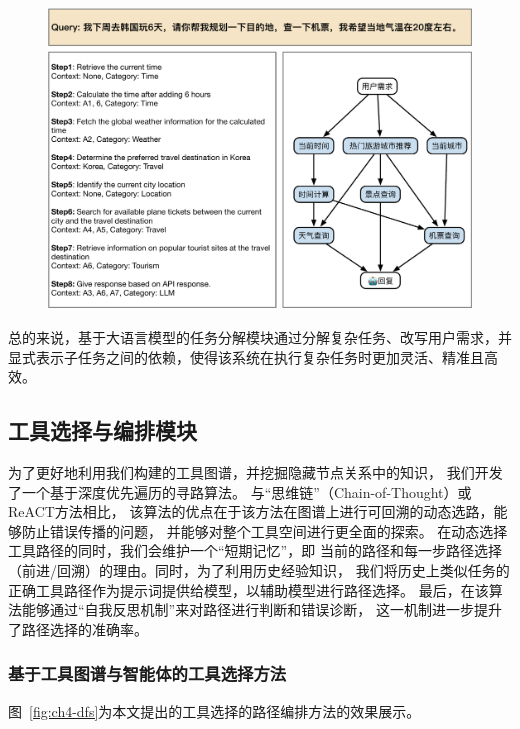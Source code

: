 \begin{figure}[!htp]
  \vspace{1em}
  \centering
  \setlength{\abovecaptionskip}{10pt} %
  \includegraphics[height=8cm]{../assets/ch4-任务分解模块.pdf}
  \label{fig:ch4-decomposition}
\end{figure}


总的来说，基于大语言模型的任务分解模块通过分解复杂任务、改写用户需求，并显式表示子任务之间的依赖，使得该系统在执行复杂任务时更加灵活、精准且高效。

\subsection{工具选择与编排模块}

为了更好地利用我们构建的工具图谱，并挖掘隐藏节点关系中的知识，
我们开发了一个基于深度优先遍历的寻路算法。
与“思维链”（Chain-of-Thought）或ReACT方法相比，
该算法的优点在于该方法在图谱上进行可回溯的动态选路，能够防止错误传播的问题，
并能够对整个工具空间进行更全面的探索。
在动态选择工具路径的同时，我们会维护一个“短期记忆”，即
当前的路径和每一步路径选择（前进/回溯）的理由。同时，为了利用历史经验知识，
我们将历史上类似任务的正确工具路径作为提示词提供给模型，以辅助模型进行路径选择。
最后，在该算法能够通过“自我反思机制”来对路径进行判断和错误诊断，
这一机制进一步提升了路径选择的准确率。

\subsubsection{基于工具图谱与智能体的工具选择方法}

图~\ref{fig:ch4-dfs}为本文提出的工具选择的路径编排方法的效果展示。

